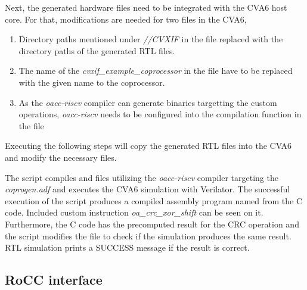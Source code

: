 \documentclass[a4paper,twoside]{tceusermanual}
\begin{document}
Next, the generated hardware files need to be integrated with the CVA6 host core. For that, modifications 
are needed for two files in the CVA6,

\begin{enumerate}
  \item%
    Directory paths mentioned under \textit{//CVXIF} in the file  replaced with 
    the directory paths of the generated RTL files.
  \item%
    The name of the \textit{cvxif\_example\_coprocessor} in the file  
    have to be replaced with the given name to the coprocessor.
    \item%
    As the \textit{oacc-riscv} compiler can generate binaries targetting the custom operations, 
    \textit{oacc-riscv} needs to be configured into the compilation function in the file 
\end{enumerate}

Executing the following steps will copy the generated RTL files into the CVA6 and modify the necessary files.  






The script  compiles  and  files utilizing the \textit{oacc-riscv} 
compiler targeting the \textit{coprogen.adf} and executes the CVA6 simulation with Verilator.
The successful execution of the script produces a compiled assembly program named  from the C code. 
Included custom instruction \textit{oa\_crc\_xor\_shift} can be seen on it.
Furthermore, the C code has the precomputed result for the CRC operation and the script modifies the  
file to check if the simulation produces the same result. RTL simulation prints a SUCCESS message if the result is correct.


\subsection{RoCC interface}
\label{ssec:roccinterface}
\end{document}
